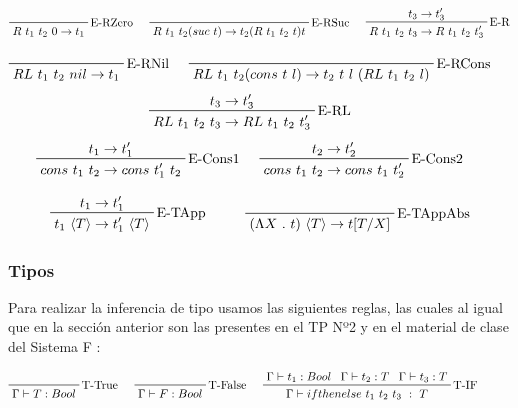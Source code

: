\documentclass[12pt, titlepage, a4paper]{article}
\begin{document}
\begin{displaymath}
    \prftree[r]{E-RZero}{R \ t_1 \ t_2 \ 0 \rightarrow t_1} \hspace{0.5cm}
    \prftree[r]{E-RSuc}{R \ t_1 \ t_2 (suc \ t) \rightarrow t_2 (R \ t_1 \ t_2 \ t) t} \hspace{0.5cm}
    \prftree[r]{E-R}{t_3 \rightarrow t_3'}{R \ t_1 \ t_2 \ t_3 \rightarrow R \ t_1 \ t_2 \ t_3'}
\end{displaymath}


\begin{displaymath}
    \prftree[r]{E-RNil}{RL \ t_1 \ t_2 \ nil \rightarrow t_1} \hspace{0.5cm}
    \prftree[r]{E-RCons}{RL \ t_1 \ t_2 (cons \ t \ l) \rightarrow t_2 \ t \ l \ (RL \ t_1 \ t_2 \ l)} \hspace{0.5cm}
\end{displaymath}
\begin{displaymath}
    \prftree[r]{E-RL}{t_3 \rightarrow t_3'}{RL \ t_1 \ t_2 \ t_3 \rightarrow RL \ t_1 \ t_2 \ t_3'} \hspace{0.5cm}
\end{displaymath}
\begin{displaymath}
  \prftree[r]{E-Cons1}{t_1 \rightarrow t_1'}{cons \ t_1 \ t_2 \rightarrow cons \ t_1' \ t_2} \hspace{0.5cm}
  \prftree[r]{E-Cons2}{t_2 \rightarrow t_2'}{cons \ t_1 \ t_2 \rightarrow cons \ t_1 \ t_2'} \hspace{0.5cm}
\end{displaymath}


\begin{displaymath}
    \prftree[r]{E-TApp}{t_1 \rightarrow t_1'}{t_1 \ \langle T \rangle \rightarrow t_1' \ \langle T \rangle} \hspace{1cm}
    \prftree[r]{E-TAppAbs}{(\Lambda X \ . \ t)\ \langle T \rangle \rightarrow t[T/X]}
\end{displaymath}

\subsubsection{Tipos}
Para realizar la inferencia de tipo usamos las siguientes reglas, las cuales al igual que en la sección anterior son las
presentes en el TP Nº2 \cite{tp2:lambdaCalculoSimpleTipado} y en el material de clase del Sistema F \cite{ALP:Polimorfismo}:

\begin{displaymath}
    \prftree[r]{T-True}{\Gamma \vdash T: Bool} \hspace{0.5cm}
    \prftree[r]{T-False}{\Gamma \vdash F:  Bool} \hspace{0.5cm}  
    \prftree[r]{T-IF}{\Gamma \vdash t_1 : Bool}{\Gamma \vdash t_2 : T}{\Gamma \vdash t_3 : T}{\Gamma \vdash ifthenelse \ t_1 \ t_2 \ t_3 \ : \ T} \hspace{1cm}
\end{displaymath}
\end{document}

